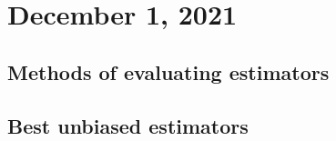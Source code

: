 \section{December 1, 2021}
\subsection{Methods of evaluating estimators}
\subsection{Best unbiased estimators}